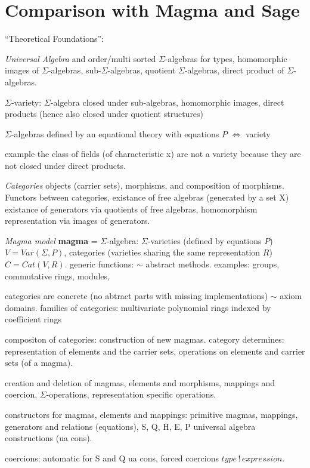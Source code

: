 \documentclass{llncs}
\begin{document}
\section{Comparison with Magma and Sage} %
\label{sec:magma}

``Theoretical Foundations'':

{\em Universal Algebra} and order/multi sorted $\Sigma$-algebras for types,
homomorphic images of $\Sigma$-algebras, sub-$\Sigma$-algebras,
quotient $\Sigma$-algebras, direct product of $\Sigma$-algebras.

$\Sigma$-variety: $\Sigma$-algebra closed under sub-algebras,
homomorphic images, direct products (hence also closed under quotient
structures)

$\Sigma$-algebras defined by an equational theory with equations $P$ 
$\Longleftrightarrow$ variety

example the class of fields (of characteristic x) are not a variety
because they are not closed under direct products.

{\em Categories} objects (carrier sets), morphisms, and composition of morphisms.
Functors between categories, existance of free algebras (generated by a set X)
existance of generators via quotients of free algebras, 
homomorphism representation via images of generators.

{\em Magma model} {\bf magma} = $\Sigma$-algebra:
$\Sigma$-varieties (defined by equations $P$) $V = Var(\Sigma,P)$, 
categories (varieties sharing the same representation $R$) $C = Cat(V,R)$.
generic functions: $\sim$ abstract methods.
examples: groups, commutative rings, modules,

categories are concrete (no abtract parts with missing implementations) $\sim$ axiom domains.
families of categories: multivariate polynomial rings indexed by coefficient rings

compositon of categories: construction of new magmas.
category determines: representation of elements and the carrier sets, 
operations on elements and carrier sets (of a magma).

creation and deletion of magmas, elements and morphisms, mappings and coercion,
$\Sigma$-operations, representation specific operations.

constructors for magmas, elements and mappings: primitive magmas,
mappings, generators and relations (equations), S, Q, H, E, P
universal algebra constructions (ua cons).

coercions: automatic for S and Q ua cons, forced coercions $type\, !\, expression$.
\end{document}
